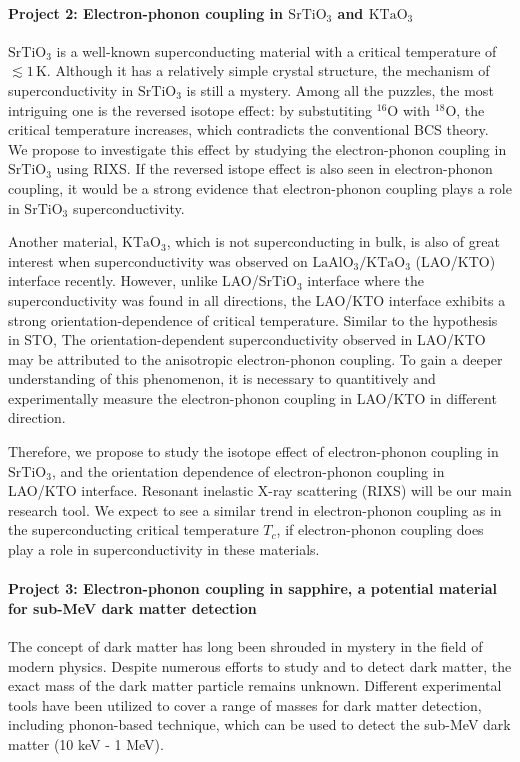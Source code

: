 \documentclass[11pt]{article}
\begin{document}
\paragraph{Project 2: Electron-phonon coupling in $\mathrm{SrTiO_{3}}$ and $\mathrm{KTaO_{3}}$} 
$\mathrm{SrTiO_{3}}$ is a well-known superconducting material with a critical temperature of $\lesssim 1\, \mathrm{K}$\cite{schooley_superconductivity_1964,lin_fermi_2013}. Although it has a relatively simple crystal structure, the mechanism of superconductivity in $\mathrm{SrTiO_{3}}$ is still a mystery. Among all the puzzles, the most intriguing one is the reversed isotope effect: by substutiting ${}^{16}\mathrm{O}$ with ${}^{18}\mathrm{O}$, the critical temperature increases, which contradicts the conventional BCS theory\cite{stucky_isotope_2016}. We propose to investigate this effect by studying the electron-phonon coupling in $\mathrm{SrTiO_{3}}$ using RIXS. If the reversed istope effect is also seen in electron-phonon coupling, it would be a strong evidence that electron-phonon coupling plays a role in $\mathrm{SrTiO_{3}}$ superconductivity.

Another material, $\mathrm{KTaO_{3}}$, which is not superconducting in bulk, is also of great interest when superconductivity was observed on $\mathrm{LaAlO_{3}/KTaO_{3}}$ (LAO/KTO) interface recently\cite{ren_two-dimensional_2022}. However, unlike LAO/$\mathrm{SrTiO_{3}}$ interface where the superconductivity was found in all directions, the LAO/KTO interface exhibits a strong orientation-dependence of critical temperature\cite{ren_two-dimensional_2022,chen_two-dimensional_2021}. Similar to the hypothesis in STO, The orientation-dependent superconductivity observed in LAO/KTO may be attributed to the anisotropic electron-phonon coupling. To gain a deeper understanding of this phenomenon, it is necessary to quantitively and experimentally measure the electron-phonon coupling in LAO/KTO in different direction.


Therefore, we propose to study the isotope effect of electron-phonon coupling in $\mathrm{SrTiO_{3}}$, and the orientation dependence of electron-phonon coupling in LAO/KTO interface. Resonant inelastic X-ray scattering (RIXS) will be our main research tool. We expect to see a similar trend in electron-phonon coupling as in the superconducting critical temperature $T_{c}$, if electron-phonon coupling does play a role in superconductivity in these materials.



\paragraph{Project 3: Electron-phonon coupling in sapphire, a potential material for sub-MeV dark matter detection}
The concept of dark matter has long been shrouded in mystery in the field of modern physics. Despite numerous efforts to study and to detect dark matter, the exact mass of the dark matter particle remains unknown. Different experimental tools have been utilized to cover a range of masses for dark matter detection, including phonon-based technique, which can be used to detect the sub-MeV dark matter (10 keV - 1 MeV).
  
\end{document}
